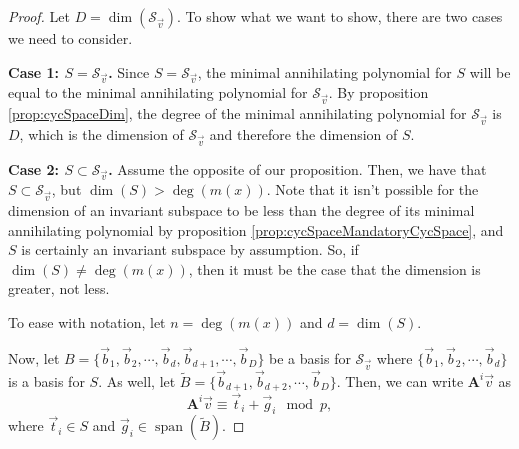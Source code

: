 \documentclass[a4paper, 12pt, reqno]{amsart}
\DeclareMathOperator{\Span}{span}
\newcommand\Mat[2][]{\mathbf{#1}^{\!#2}}
\newcommand{\cycsp}[1]{\mathcal{S}_{#1}}
\begin{document}
	\begin{proof}
		Let $D = \dim(\cycsp{\vec{v}})$. To show what we want to show, there are two cases we need to consider.
		
		\textbf{Case 1: $S = \cycsp{\vec{v}}$.} Since $S = \cycsp{\vec{v}}$, the minimal annihilating polynomial for $S$ will be equal to the minimal 
		annihilating polynomial for $\cycsp{\vec{v}}$. By proposition \ref{prop:cycSpaceDim}, the degree of the minimal annihilating polynomial for
		$\cycsp{\vec{v}}$ is $D$, which is the dimension of $\cycsp{\vec{v}}$ and therefore the dimension of $S$.
		
		\textbf{Case 2: $S \subset \cycsp{\vec{v}}$.} Assume the opposite of our proposition. Then, we have that $S \subset \cycsp{\vec{v}}$, but $\dim(S) > \deg(m(x))$. Note 
		that it isn't possible for the dimension of an invariant subspace to be less than the degree of its minimal annihilating polynomial by proposition 
		\ref{prop:cycSpaceMandatoryCycSpace}, and $S$ is certainly an invariant subspace by assumption. So, if $\dim(S) \neq \deg(m(x))$, then it must be the case that the 
		dimension is greater, not less.
		
		To ease with notation, let $n = \deg(m(x))$ and $d = \dim(S)$.
		
		Now, let $B = \{\vec{b}_1, \vec{b}_2, \cdots, \vec{b}_d, \vec{b}_{d+1}, \cdots, \vec{b}_D\}$ be a basis for $\cycsp{\vec{v}}$ where 
		$\{\vec{b}_1, \vec{b}_2, \cdots, \vec{b}_d\}$ is a basis for $S$. As well, let $\tilde{B} = \{\vec{b}_{d+1}, \vec{b}_{d+2}, \cdots, \vec{b}_D\}$. 
		Then, we can write $\Mat[A]{i}\vec{v}$ as
		\[
			\Mat[A]{i}\vec{v} \equiv \vec{t}_i + \vec{g}_i \mod{p},
		\]
		where $\vec{t}_i \in S$ and $\vec{g}_i \in \Span(\tilde{B})$.
		

\end{proof}
\end{document}
